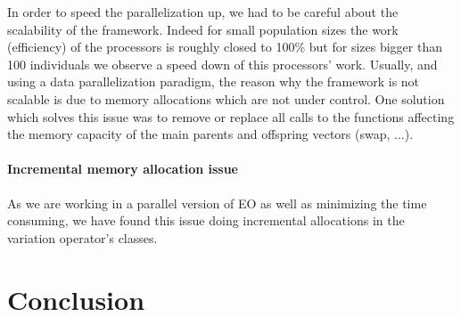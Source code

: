 In order to speed the parallelization up, we had to be careful about the scalability of the framework. Indeed for small population sizes the work (efficiency) of the processors is roughly closed to 100\% but for sizes bigger than 100 individuals we observe a speed down of this processors' work. Usually, and using a data parallelization paradigm, the reason why the framework is not scalable is due to memory allocations which are not under control. One solution which solves this issue was to remove or replace all calls to the functions affecting the memory capacity of the main parents and offspring vectors (swap, ...).



\paragraph{Incremental memory allocation issue}

As we are working in a parallel version of EO as well as minimizing the time consuming, we have found this issue doing incremental allocations in the variation operator's classes.

\section{Conclusion}


